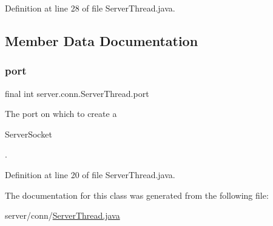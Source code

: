 Definition at line 28 of file Server\+Thread.\+java.



\subsection{Member Data Documentation}
\hypertarget{classserver_1_1conn_1_1_server_thread_aa8378d032cb5eaaf76feec72be077b4d}{}\label{classserver_1_1conn_1_1_server_thread_aa8378d032cb5eaaf76feec72be077b4d} 
\subsubsection{\texorpdfstring{port}{port}}
{\footnotesize\ttfamily final int server.\+conn.\+Server\+Thread.\+port}

The port on which to create a
\begin{DoxyCode}
ServerSocket 
\end{DoxyCode}
 . 

Definition at line 20 of file Server\+Thread.\+java.



The documentation for this class was generated from the following file\+:\begin{DoxyCompactItemize}
\item 
server/conn/\hyperlink{_server_thread_8java}{Server\+Thread.\+java}\end{DoxyCompactItemize}
